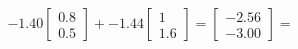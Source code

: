 \documentclass[preview]{standalone}
\begin{document}
\begin{align*}
-1.40 \begin{bmatrix} 0.8 \\ 0.5 \end{bmatrix} + -1.44 \begin{bmatrix} 1 \\ 1.6 \end{bmatrix} = \begin{bmatrix} -2.56 \\ -3.00 \end{bmatrix} =
\end{align*}
\end{document}
